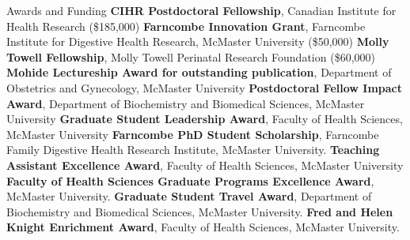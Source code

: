 \begin{rubric}{Awards and Funding}
\entry*[2023-2026] \textbf{CIHR Postdoctoral Fellowship}, Canadian Institute for Health Research (\$185,000)
%
\entry*[2023-2025] \textbf{Farncombe Innovation Grant}, Farncombe Institute for Digestive Health Research, McMaster University (\$50,000)
%
\entry*[2022-2023] \textbf{Molly Towell Fellowship}, Molly Towell Perinatal Research Foundation (\$60,000)
%
\entry*[2022] \textbf{Mohide Lectureship Award for outstanding publication}, Department of Obstetrics and Gynecology, McMaster University
%
\entry*[2022] \textbf{Postdoctoral Fellow Impact Award}, Department of Biochemistry and Biomedical Sciences, McMaster University
%
\entry*[2020] \textbf{Graduate Student Leadership Award}, Faculty of Health Sciences, McMaster University
%
\entry*[2016-2020] \textbf{Farncombe PhD Student Scholarship}, Farncombe Family Digestive Health Research Institute, McMaster University.
%
\entry*[2019] \textbf{Teaching Assistant Excellence Award}, Faculty of Health Sciences, McMaster University
%
\entry*[2018, 2019] \textbf{Faculty of Health Sciences Graduate Programs Excellence Award}, McMaster University.
%
\entry*[2016-2019] \textbf{Graduate Student Travel Award}, Department of Biochemistry and Biomedical Sciences, McMaster University.
%
%
\entry*[2016, 2017] \textbf{Fred and Helen Knight Enrichment Award}, Faculty of Health Sciences, McMaster University.
%
%
\end{rubric}

